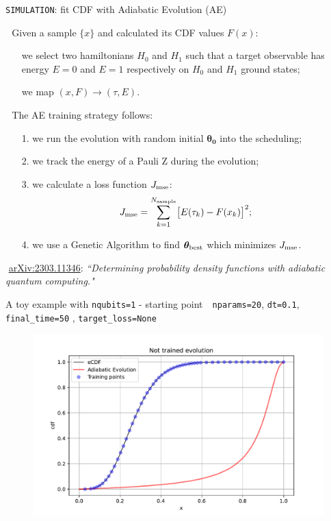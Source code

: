 \documentclass[9pt, xcolor={svgnames}, hyperref={colorlinks, linkcolor=black, citecolor=amethyst, urlcolor=amethyst}]{beamer}
\begin{document}
\begin{frame}[fragile]{\texttt{SIMULATION}: fit CDF with Adiabatic Evolution (AE)}
\small

\faArrowCircleRight\,\, Given a sample $\{x\}$ and calculated its CDF values $F(x)$:
\pause
\begin{itemize}[noitemsep]
\item[\faChain] we select two hamiltonians $H_0$ and $H_1$ such that a target observable
has energy $E=0$ and $E=1$ respectively on $H_0$ and $H_1$ ground states;
\pause
\item[\faChain] we map $(x, F)\to(\tau, E)$.
\end{itemize}

\pause
\faArrowCircleRight\,\, The AE training strategy follows:
\begin{itemize}[noitemsep]
\pause
\item[1.] we run the evolution with random initial $\bm{\theta_0}$ into the scheduling;
\pause
\item[2.] we track the energy of a Pauli Z during the evolution;
\pause
\item[3.] we calculate a loss function $J_{\rm mse}$:
         $$ J_{\rm mse} = \sum_{k=1}^{N_{\rm sample}} \bigl[ E(\tau_k) - F(x_k) \bigr]^2; $$
\pause
\item[4.] we use a Genetic Algorithm to find $\bm{\theta}_{\rm best}$ which minimizes $J_{\rm mse}$.
\end{itemize} 
\pause
\vfill
\footnotesize
\faBook\,\,\href{https://arxiv.org/abs/2303.11346}{arXiv:2303.11346}: \textit{``Determining probability density functions with adiabatic quantum computing."}\\
\end{frame}

\begin{frame}[fragile]{A toy example with \texttt{nqubits=1} - starting point}
\large
\faArrowCircleRight\,\, \texttt{nparams=20}, \texttt{dt=0.1}, \texttt{final\_time=50}
, \texttt{target\_loss=None}
\begin{figure}
    \includegraphics[width=1\textwidth]{figures/ev0.pdf}
\end{figure}
\end{frame}
\end{document}
